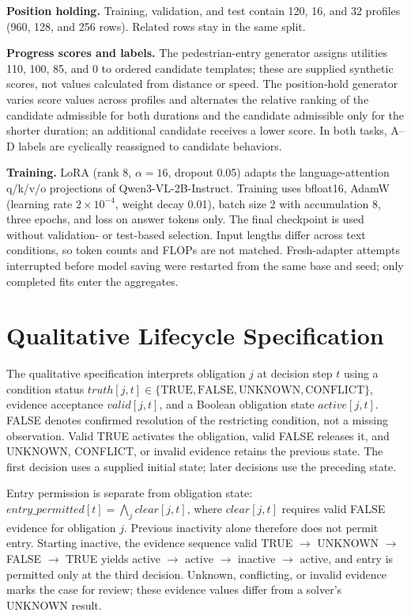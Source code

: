 \documentclass[10pt]{article}
\begin{document}
\textbf{Position holding.} Training, validation, and test contain 120, 16, and
32 profiles (960, 128, and 256 rows). Related rows stay in the same split.

\textbf{Progress scores and labels.} The pedestrian-entry generator assigns
utilities 110, 100, 85, and 0 to ordered candidate templates; these are
supplied synthetic scores, not values calculated from distance or speed. The
position-hold generator varies score values across profiles and alternates the
relative ranking of the candidate admissible for both durations and the
candidate admissible only for the shorter duration; an additional candidate
receives a lower score. In both tasks, A--D labels are cyclically reassigned to
candidate behaviors.

\textbf{Training.} LoRA (rank 8, $\alpha=16$, dropout 0.05) adapts the
language-attention q/k/v/o projections of Qwen3-VL-2B-Instruct. Training uses
bfloat16, AdamW (learning rate $2\times10^{-4}$, weight decay 0.01), batch size
2 with accumulation 8, three epochs, and loss on answer tokens only. The final
checkpoint is used without validation- or test-based selection. Input lengths
differ across text conditions, so token counts and FLOPs are not matched.
Fresh-adapter attempts interrupted before model saving were restarted from the
same base and seed; only completed fits enter the aggregates.

\section{Qualitative Lifecycle Specification}\label{sup:lifecycle}

The qualitative specification interprets obligation $j$ at decision step $t$
using a condition status $\mathit{truth}[j,t]\in\{\mathrm{TRUE},\mathrm{FALSE},
\mathrm{UNKNOWN},\mathrm{CONFLICT}\}$, evidence acceptance $\mathit{valid}[j,t]$,
and a Boolean obligation state $\mathit{active}[j,t]$. FALSE denotes confirmed
resolution of the restricting condition, not a missing observation. Valid TRUE
activates the obligation, valid FALSE releases it, and UNKNOWN, CONFLICT, or
invalid evidence retains the previous state. The first decision uses a supplied
initial state; later decisions use the preceding state.

Entry permission is separate from obligation state:
$\mathit{entry\_permitted}[t]=\bigwedge_j \mathit{clear}[j,t]$, where
$\mathit{clear}[j,t]$ requires valid FALSE evidence for obligation $j$. Previous
inactivity alone therefore does not permit entry. Starting inactive, the
evidence sequence valid TRUE $\rightarrow$ UNKNOWN $\rightarrow$ FALSE
$\rightarrow$ TRUE yields active $\rightarrow$ active $\rightarrow$ inactive
$\rightarrow$ active, and entry is permitted only at the third decision.
Unknown, conflicting, or invalid evidence marks the case for review; these
evidence values differ from a solver's UNKNOWN result.
\end{document}
